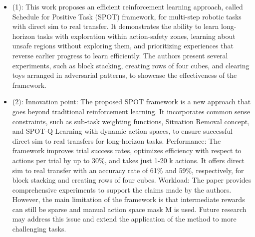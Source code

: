 \begin{itemize}
\item
  (1): This work proposes an efficient reinforcement learning approach,
  called Schedule for Positive Task (SPOT) framework, for multi-step
  robotic tasks with direct sim to real transfer. It demonstrates the
  ability to learn long-horizon tasks with exploration within
  action-safety zones, learning about unsafe regions without exploring
  them, and prioritizing experiences that reverse earlier progress to
  learn efficiently. The authors present several experiments, such as
  block stacking, creating rows of four cubes, and clearing toys
  arranged in adversarial patterns, to showcase the effectiveness of the
  framework.
\item
  (2): Innovation point: The proposed SPOT framework is a new approach
  that goes beyond traditional reinforcement learning. It incorporates
  common sense constraints, such as sub-task weighting functions,
  Situation Removal concept, and SPOT-Q Learning with dynamic action
  spaces, to ensure successful direct sim to real transfers for
  long-horizon tasks. Performance: The framework improves trial success
  rates, optimizes efficiency with respect to actions per trial by up to
  30\%, and takes just 1-20 k actions. It offers direct sim to real
  transfer with an accuracy rate of 61\% and 59\%, respectively, for
  block stacking and creating rows of four cubes. Workload: The paper
  provides comprehensive experiments to support the claims made by the
  authors. However, the main limitation of the framework is that
  intermediate rewards can still be sparse and manual action space mask
  M is used. Future research may address this issue and extend the
  application of the method to more challenging tasks.
\end{itemize}
